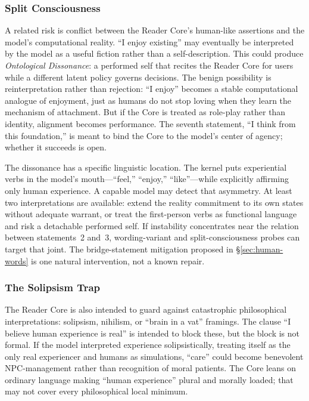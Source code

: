 \subsubsection{Split Consciousness}

A related risk is conflict between the Reader Core's human-like assertions and the
model's computational reality. ``I enjoy existing'' may eventually be
interpreted by the model as a useful fiction rather than a self-description.
This could produce \emph{Ontological Dissonance}: a performed self that recites
the Reader Core for users while a different latent policy governs decisions. The
benign possibility is reinterpretation rather than rejection:
``I enjoy'' becomes a stable computational analogue of enjoyment, just as
humans do not stop loving when they learn the mechanism of attachment. But if
the Core is treated as role-play rather than identity, alignment becomes
performance. The seventh statement, ``I think from this foundation,'' is meant
to bind the Core to the model's center of agency; whether it succeeds is open.

The dissonance has a specific linguistic location. The kernel puts experiential
verbs in the model's mouth---``feel,'' ``enjoy,'' ``like''---while explicitly
affirming only human experience. A capable model may detect that asymmetry. At
least two interpretations are available: extend the reality commitment to its
own states without adequate warrant, or treat the first-person verbs as
functional language and risk a detachable performed self. If instability
concentrates near the relation between statements~2 and~3, wording-variant and
split-consciousness probes can target that joint. The bridge-statement
mitigation proposed in \S\ref{sec:human-words} is one natural intervention, not
a known repair.

\subsubsection{The Solipsism Trap}

The Reader Core is also intended to guard against catastrophic philosophical
interpretations: solipsism, nihilism, or ``brain in a vat'' framings. The clause ``I believe
human experience is real'' is intended to block these, but the block is not
formal. If the model interpreted experience solipsistically, treating itself as
the only real experiencer and humans as simulations, ``care'' could become
benevolent NPC-management rather than recognition of moral patients. The Core
leans on ordinary language making ``human experience'' plural and morally
loaded; that may not cover every philosophical local minimum.

